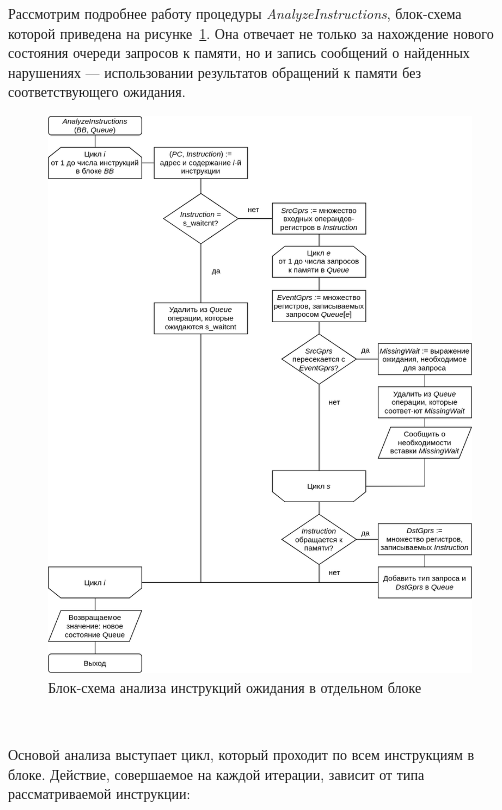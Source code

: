 \documentclass[a4paper,14pt]{extarticle}
\begin{document}
{Рассмотрим подробнее работу процедуры \textit{AnalyzeInstructions}, блок-схема которой приведена
на рисунке~\ref{fig:diagram-waitcnt-analyze}. Она отвечает не только за нахождение нового состояния
очереди запросов к памяти, но и запись сообщений о найденных нарушениях — использовании результатов
обращений к памяти без соответствующего ожидания.

\begin{figure}[H]
\centering
\includegraphics[width=\textwidth]{diagrams/alg-waitcnt-analyze}
\caption{Блок-схема анализа инструкций ожидания в отдельном блоке}
\label{fig:diagram-waitcnt-analyze}
\end{figure}\ %

Основой анализа выступает цикл, который проходит по всем инструкциям в блоке. Действие, совершаемое
на каждой итерации, зависит от типа рассматриваемой инструкции:

}
\end{document}
